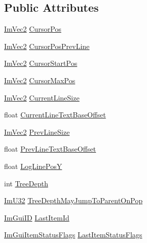 \subsection*{Public Attributes}
\begin{DoxyCompactItemize}
\item 
\mbox{\hyperlink{struct_im_vec2}{Im\+Vec2}} \mbox{\hyperlink{struct_im_gui_window_temp_data_aa76e59bf36a6b212c667dbb2706cdc54}{Cursor\+Pos}}
\item 
\mbox{\hyperlink{struct_im_vec2}{Im\+Vec2}} \mbox{\hyperlink{struct_im_gui_window_temp_data_add9d6659678ffce16d2b1653a8c15c35}{Cursor\+Pos\+Prev\+Line}}
\item 
\mbox{\hyperlink{struct_im_vec2}{Im\+Vec2}} \mbox{\hyperlink{struct_im_gui_window_temp_data_a4e5c2b786d40849ce195f670e2e4e78e}{Cursor\+Start\+Pos}}
\item 
\mbox{\hyperlink{struct_im_vec2}{Im\+Vec2}} \mbox{\hyperlink{struct_im_gui_window_temp_data_a2b8a133355700fe72f9c06d67e252d26}{Cursor\+Max\+Pos}}
\item 
\mbox{\hyperlink{struct_im_vec2}{Im\+Vec2}} \mbox{\hyperlink{struct_im_gui_window_temp_data_a28ddbf18fa745335ad6691e9dbd97c52}{Current\+Line\+Size}}
\item 
float \mbox{\hyperlink{struct_im_gui_window_temp_data_a77782eeee147c73d9d3281932ebbb93b}{Current\+Line\+Text\+Base\+Offset}}
\item 
\mbox{\hyperlink{struct_im_vec2}{Im\+Vec2}} \mbox{\hyperlink{struct_im_gui_window_temp_data_aa8959576942c6611ce792490c5adc830}{Prev\+Line\+Size}}
\item 
float \mbox{\hyperlink{struct_im_gui_window_temp_data_a56ea966c95f667c41f6ef2d6c0ad7aa2}{Prev\+Line\+Text\+Base\+Offset}}
\item 
float \mbox{\hyperlink{struct_im_gui_window_temp_data_a452c90bd8a615f4c4b36a732d7ef2460}{Log\+Line\+PosY}}
\item 
int \mbox{\hyperlink{struct_im_gui_window_temp_data_aaa472783238040464cce2984c1a3ed47}{Tree\+Depth}}
\item 
\mbox{\hyperlink{imgui_8h_a118cff4eeb8d00e7d07ce3d6460eed36}{Im\+U32}} \mbox{\hyperlink{struct_im_gui_window_temp_data_a1d49eb210a34519d68cc51599aafaf86}{Tree\+Depth\+May\+Jump\+To\+Parent\+On\+Pop}}
\item 
\mbox{\hyperlink{imgui_8h_a1785c9b6f4e16406764a85f32582236f}{Im\+Gui\+ID}} \mbox{\hyperlink{struct_im_gui_window_temp_data_a99e9264022bd51b04c91a753c929ddfc}{Last\+Item\+Id}}
\item 
\mbox{\hyperlink{imgui__internal_8h_a86b8f9e2fd4084fb2112f003070b53fa}{Im\+Gui\+Item\+Status\+Flags}} \mbox{\hyperlink{struct_im_gui_window_temp_data_a28ec4cf6e201bc2cbf0ac6045eb00b12}{Last\+Item\+Status\+Flags}}

\end{DoxyCompactItemize}
